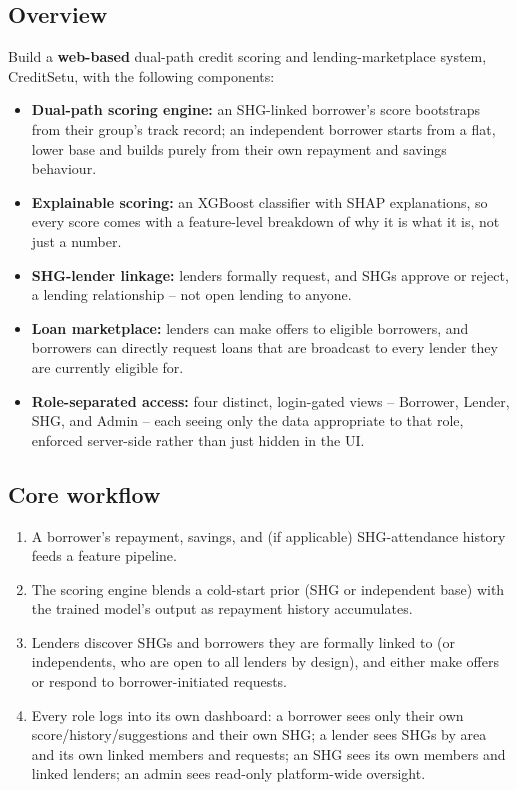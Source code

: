 \documentclass[11pt,a4paper]{article}
\begin{document}
\subsection{Overview}
Build a \textbf{web-based} dual-path credit scoring and
lending-marketplace system, CreditSetu, with the
following components:
\begin{itemize}[leftmargin=0.7cm]
    \item \textbf{Dual-path scoring engine:} an SHG-linked
    borrower's score bootstraps from their group's track
    record; an independent borrower starts from a flat,
    lower base and builds purely from their own repayment
    and savings behaviour.
    \item \textbf{Explainable scoring:} an XGBoost
    classifier with SHAP explanations, so every score
    comes with a feature-level breakdown of why it is what
    it is, not just a number.
    \item \textbf{SHG-lender linkage:} lenders formally
    request, and SHGs approve or reject, a lending
    relationship -- not open lending to anyone.
    \item \textbf{Loan marketplace:} lenders can make
    offers to eligible borrowers, and borrowers can
    directly request loans that are broadcast to every
    lender they are currently eligible for.
    \item \textbf{Role-separated access:} four distinct,
    login-gated views -- Borrower, Lender, SHG, and
    Admin -- each seeing only the data appropriate to that
    role, enforced server-side rather than just hidden in
    the UI.
\end{itemize}

\subsection{Core workflow}
\begin{enumerate}[leftmargin=0.7cm]
    \item A borrower's repayment, savings, and (if
    applicable) SHG-attendance history feeds a feature
    pipeline.
    \item The scoring engine blends a cold-start prior
    (SHG or independent base) with the trained model's
    output as repayment history accumulates.
    \item Lenders discover SHGs and borrowers they are
    formally linked to (or independents, who are open to
    all lenders by design), and either make offers or
    respond to borrower-initiated requests.
    \item Every role logs into its own dashboard: a
    borrower sees only their own score/history/suggestions
    and their own SHG; a lender sees SHGs by area and its
    own linked members and requests; an SHG sees its own
    members and linked lenders; an admin sees read-only
    platform-wide oversight.
\end{enumerate}
\end{document}
